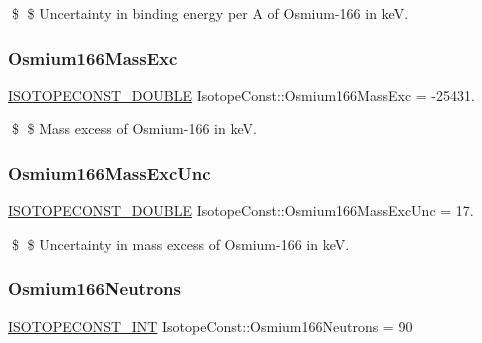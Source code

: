\$ \$ Uncertainty in binding energy per A of Osmium-\/166 in keV. \mbox{\label{group___isotope_const-_osmium-_os166_gaf3dc1cbac1b8d27d3c76646e1b28b5de}} 
\subsubsection{\texorpdfstring{Osmium166\+Mass\+Exc}{Osmium166MassExc}}
{\footnotesize\ttfamily \mbox{\hyperlink{group___isotope_const-_macros_ga8f45a7272ce02c0b4c65c44636ed719a}{I\+S\+O\+T\+O\+P\+E\+C\+O\+N\+S\+T\+\_\+\+D\+O\+U\+B\+LE}} Isotope\+Const\+::\+Osmium166\+Mass\+Exc = -\/25431.}

\$ \$ Mass excess of Osmium-\/166 in keV. \mbox{\label{group___isotope_const-_osmium-_os166_ga7029b5ab4d36297237ea0ca4bf4cce28}} 
\subsubsection{\texorpdfstring{Osmium166\+Mass\+Exc\+Unc}{Osmium166MassExcUnc}}
{\footnotesize\ttfamily \mbox{\hyperlink{group___isotope_const-_macros_ga8f45a7272ce02c0b4c65c44636ed719a}{I\+S\+O\+T\+O\+P\+E\+C\+O\+N\+S\+T\+\_\+\+D\+O\+U\+B\+LE}} Isotope\+Const\+::\+Osmium166\+Mass\+Exc\+Unc = 17.}

\$ \$ Uncertainty in mass excess of Osmium-\/166 in keV. \mbox{\label{group___isotope_const-_osmium-_os166_gaa1cbf79dbe5bd66e412387f8e9346068}} 
\subsubsection{\texorpdfstring{Osmium166\+Neutrons}{Osmium166Neutrons}}
{\footnotesize\ttfamily \mbox{\hyperlink{group___isotope_const-_macros_ga5f18360b3e99483a35c32d789e62621c}{I\+S\+O\+T\+O\+P\+E\+C\+O\+N\+S\+T\+\_\+\+I\+NT}} Isotope\+Const\+::\+Osmium166\+Neutrons = 90}

